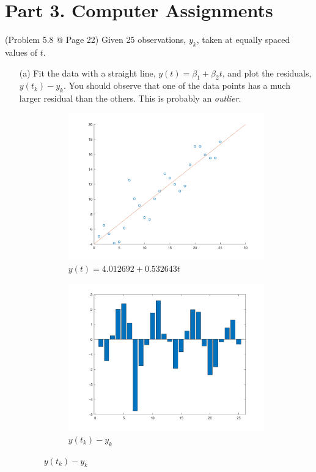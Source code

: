 \documentclass[10pt]{report}
\begin{document}
\section*{Part 3. Computer Assignments}
(Problem 5.8 @ Page 22) Given 25 observations, $y_k$, taken at equally spaced values of $t$.
\begin{enumerate}
	\item [(a)]
	Fit the data with a straight line, $y(t) = \beta_1 + \beta_2 t$, and plot the residuals, $y(t_k)-y_k$. You should observe that one of the data points has a much larger residual than the others. This is probably an \textit{outlier}.
	
	
	\begin{figure}[H]
		\begin{subfigure}[b]{0.5\linewidth}
			\centering
			\includegraphics[width=\linewidth]{hw5ca1a_fit}
			\caption*{$y(t) = 4.012692 + 0.532643t$}
		\end{subfigure}
		\begin{subfigure}[b]{0.5\linewidth}
			\centering
			\includegraphics[width=\linewidth]{hw5ca1a_residual} 
			\caption*{$y(t_k)-y_k$}
		\end{subfigure}
	\end{figure}
	

\end{enumerate}
\end{document}
